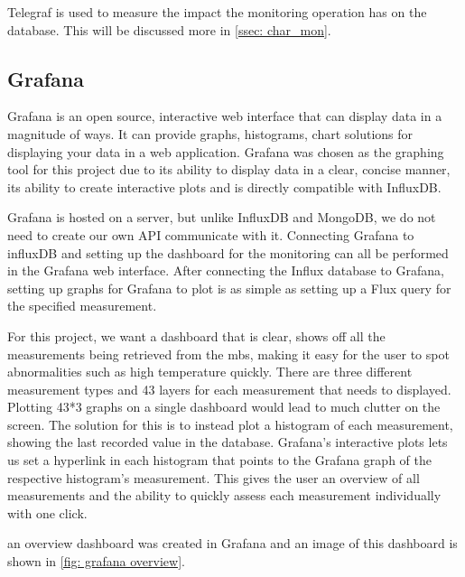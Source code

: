 \documentclass[main.tex]{subfiles}
\begin{document}
Telegraf is used to measure the impact the monitoring operation has on the database. This will be discussed more in \autoref{ssec: char_mon}.

\subsection{Grafana}
\label{ssec: grafana}
Grafana is an open source, interactive web interface that can display data in a magnitude of ways. It can provide graphs, histograms, chart solutions for displaying your data in a web application. Grafana was chosen as the graphing tool for this project due to its ability to display data in a clear, concise manner, its ability to create interactive plots and is directly compatible with InfluxDB.

Grafana is hosted on a server, but unlike InfluxDB and MongoDB, we do not need to create our own API communicate with it. Connecting Grafana to influxDB and setting up the dashboard for the monitoring can all be performed in the Grafana web interface. After connecting the Influx database to Grafana, setting up graphs for Grafana to plot is as simple as setting up a Flux query for the specified measurement.

For this project, we want a dashboard that is clear, shows off all the measurements being retrieved from the \gls{mb}s, making it easy for the user to spot abnormalities such as high temperature quickly. There are three different measurement types and 43 layers for each measurement that needs to displayed. Plotting 43*3 graphs on a single dashboard would lead to much clutter on the screen. The solution for this is to instead plot a histogram of each measurement, showing the last recorded value in the database. Grafana's interactive plots lets us set a hyperlink in each histogram that points to the Grafana graph of the respective histogram's measurement. This gives the user an overview of all measurements and the ability to quickly assess each measurement individually with one click.

an overview dashboard was created in Grafana and an image of this dashboard is shown in \autoref{fig: grafana overview}.
\end{document}

